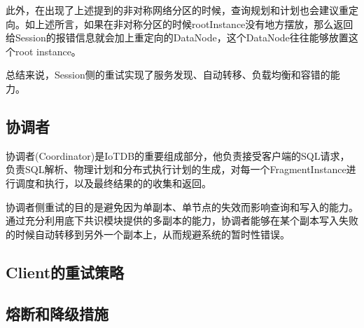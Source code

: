 此外，在出现了上述提到的非对称网络分区的时候，查询规划和计划也会建议重定向。如上述所言，如果在非对称分区的时候rootInstance没有地方摆放，那么返回给Session的报错信息就会加上重定向的DataNode，这个DataNode往往能够放置这个root instance。


总结来说，Session侧的重试实现了服务发现、自动转移、负载均衡和容错的能力。



\subsection{协调者}

协调者(Coordinator)是IoTDB的重要组成部分，他负责接受客户端的SQL请求，负责SQL解析、物理计划和分布式执行计划的生成，对每一个FragmentInstance进行调度和执行，以及最终结果的的收集和返回。

协调者侧重试的目的是避免因为单副本、单节点的失效而影响查询和写入的能力。通过充分利用底下共识模块提供的多副本的能力，协调者能够在某个副本写入失败的时候自动转移到另外一个副本上，从而规避系统的暂时性错误。






\subsection{Client的重试策略}






\subsection{熔断和降级措施}



